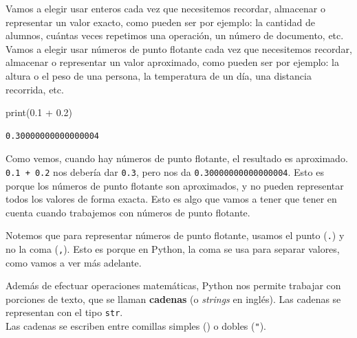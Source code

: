 \documentclass[
  letterpaper,
  DIV=11,
  numbers=noendperiod]{scrreprt}
\newenvironment{Shaded}{\begin{snugshade}}{\end{snugshade}}
\newcommand{\BuiltInTok}[1]{\textcolor[rgb]{0.00,0.23,0.31}{#1}}
\newcommand{\FloatTok}[1]{\textcolor[rgb]{0.68,0.00,0.00}{#1}}
\newcommand{\NormalTok}[1]{\textcolor[rgb]{0.00,0.23,0.31}{#1}}
\newcommand{\OperatorTok}[1]{\textcolor[rgb]{0.37,0.37,0.37}{#1}}
\begin{document}
Vamos a elegir usar enteros cada vez que necesitemos recordar, almacenar
o representar un valor exacto, como pueden ser por ejemplo: la cantidad
de alumnos, cuántas veces repetimos una operación, un número de
documento, etc.\\
Vamos a elegir usar números de punto flotante cada vez que necesitemos
recordar, almacenar o representar un valor aproximado, como pueden ser
por ejemplo: la altura o el peso de una persona, la temperatura de un
día, una distancia recorrida, etc.

\begin{Shaded}
\begin{Highlighting}[]
\BuiltInTok{print}\NormalTok{(}\FloatTok{0.1} \OperatorTok{+} \FloatTok{0.2}\NormalTok{)}
\end{Highlighting}
\end{Shaded}

\begin{verbatim}
0.30000000000000004
\end{verbatim}

Como vemos, cuando hay números de punto flotante, el resultado es
aproximado. \texttt{0.1\ +\ 0.2} nos debería dar \texttt{0.3}, pero nos
da \texttt{0.30000000000000004}. Esto es porque los números de punto
flotante son aproximados, y no pueden representar todos los valores de
forma exacta. Esto es algo que vamos a tener que tener en cuenta cuando
trabajemos con números de punto flotante.

\begin{tcolorbox}[enhanced jigsaw, arc=.35mm, toptitle=1mm, colframe=quarto-callout-note-color-frame, bottomtitle=1mm, opacitybacktitle=0.6, colbacktitle=quarto-callout-note-color!10!white, leftrule=.75mm, coltitle=black, toprule=.15mm, titlerule=0mm, title=\textcolor{quarto-callout-note-color}{\faInfo}\hspace{0.5em}{Uso de punto}, bottomrule=.15mm, rightrule=.15mm, colback=white, breakable, opacityback=0, left=2mm]

Notemos que para representar números de punto flotante, usamos el punto
(\texttt{.}) y no la coma (\texttt{,}). Esto es porque en Python, la
coma se usa para separar valores, como vamos a ver más adelante.

\end{tcolorbox}

Además de efectuar operaciones matemáticas, Python nos permite trabajar
con porciones de texto, que se llaman \textbf{cadenas} (o \emph{strings}
en inglés). Las cadenas se representan con el tipo \texttt{str}.\\
Las cadenas se escriben entre comillas simples
(\texttt{\textquotesingle{}}) o dobles (\texttt{"}).
\end{document}
